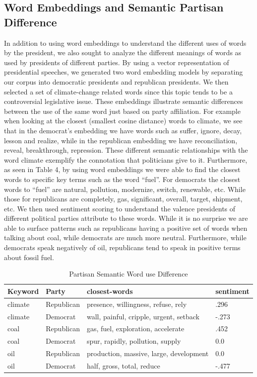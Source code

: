 \documentclass{article}
\begin{document}
{\subsection{Word Embeddings and Semantic Partisan Difference}{
In addition to using word embeddings to understand the different uses of words by the president, we also sought to analyze the different meanings of words as used by presidents of different parties. By using a vector representation of presidential speeches, we generated two word embedding models by separating our corpus into democratic presidents and republican presidents. We then selected a set of climate-change related words since this topic tends to be a controversial legislative issue. These embeddings illustrate semantic differences between the use of the same word just based on party affiliation. For example when looking at the closest (smallest cosine distance) words to climate, we see that in the democrat's embedding we have words such as suffer, ignore, decay, lesson and realize, while in the republican embedding we have reconciliation, reveal, breakthrough, repression. These different semantic relationships with the word climate exemplify the connotation that politicians give to it. 
Furthermore, as seen in Table 4, by using word embeddings we were able to find the closest words to specific key terms such as the word “fuel”.  For democrats the closest words to “fuel” are natural, pollution, modernize, switch, renewable, etc. While those for republicans are completely, gas, significant, overall, target, shipment, etc.
We then used sentiment scoring to understand the valence presidents of different political parties attribute to these words. While it is no surprise we are able to surface patterns such as republicans having a positive set of words when talking about coal, while democrats are much more neutral. Furthermore, while democrats speak negatively of oil, republicans tend to speak in positive terms about fossil fuel.

\begin{table}[H]
	\caption{Partisan Semantic Word use Difference}
	\centering
	\begin{tabular}{llll}
		\toprule
		\midrule
		Keyword  & Party & closest-words & sentiment\\
		\midrule
		\midrule
		climate & Republican & presence, willingness, refuse, rely  & .296  \\
		\midrule
		climate & Democrat & wall, painful, cripple, urgent, setback & -.273   \\
		\midrule
		coal & Republican & gas, fuel, exploration, accelerate & .452   \\
		\midrule
		coal & Democrat & spur, rapidly, pollution, supply & 0.0   \\
		\midrule 
		oil & Republican & production, massive, large, development & 0.0    \\
		\midrule
		oil & Democrat & half, gross, total, reduce & -.477   \\
		\bottomrule
	\end{tabular}
\end{table}}

}
\end{document}
